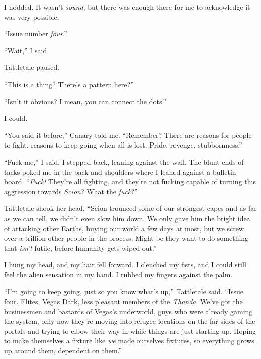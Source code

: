 I nodded.  It wasn't \emph{sound}, but there was enough there for me to acknowledge it was very possible.



``Issue number \emph{four}.''



``Wait,'' I said.



Tattletale paused.



``This is a thing?  There's a pattern here?''



``Isn't it obvious?  I mean, you can connect the dots.''



I could.



``You said it before,'' Canary told me.  ``Remember?  There are reasons for people to fight, reasons to keep going when all is lost.  Pride, revenge, stubbornness.''



``Fuck me,'' I said.  I stepped back, leaning against the wall.  The blunt ends of tacks poked me in the back and shoulders where I leaned against a bulletin board.  ``\emph{Fuck!}  They're all fighting, and they're not fucking capable of turning this aggression towards \emph{Scion}?  What the \emph{fuck}?''



Tattletale shook her head.  ``Scion trounced some of our strongest capes and as far as we can tell, we didn't even slow him down.  We only gave him the bright idea of attacking other Earths, buying our world a few days at most, but we screw over a trillion other people in the process.  Might be they want to do something that \emph{isn't} futile, before humanity gets wiped out.''



I hung my head, and my hair fell forward.  I clenched my fists, and I could still feel the alien sensation in my hand.  I rubbed my fingers against the palm.



``I'm going to keep going, just so you know what's up,'' Tattletale said.  ``Issue four.  Elites, Vegas Dark, less pleasant members of the \emph{Thanda}.  We've got the businessmen and bastards of Vegas's underworld, guys who were already gaming the system, only now they're moving into refugee locations on the far sides of the portals and trying to elbow their way in while things are just starting up.  Hoping to make themselves a fixture like \emph{we} made ourselves fixtures, so everything grows up around them, dependent on them.''



